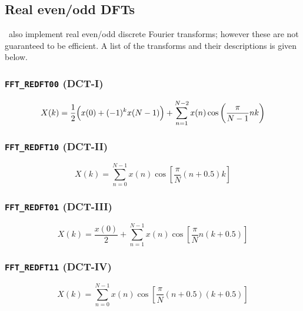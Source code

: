 \subsection{Real even/odd DFTs}
\label{module:fft:r2r}
%
\liquid\ also implement real even/odd discrete Fourier transforms;
however these are not guaranteed to be efficient.
A list of the transforms and their descriptions is given below.
%
\subsubsection{{\tt FFT\_REDFT00} (DCT-I)}
\label{module:fft:r2r:REDFT00}
    \begin{equation}
    \label{eqn:fft:dct-I}
        X(k) = \frac{1}{2}\Bigl( x(0) + (-1)^k x(N-1) \Bigr) + 
               \sum_{n=1}^{N-2}{x(n) \cos\left(\frac{\pi}{N-1}nk\right) }
    \end{equation}

\subsubsection{{\tt FFT\_REDFT10} (DCT-II)}
\label{module:fft:r2r:REDFT10}
    \begin{equation}
    \label{eqn:fft:dct-II}
        X(k) =  \sum_{n=0}^{N-1}{
                    x(n) \cos\left[
                        \frac{\pi}{N}\left(n + 0.5\right)k
                    \right]
                }
    \end{equation}

\subsubsection{{\tt FFT\_REDFT01} (DCT-III)}
\label{module:fft:r2r:REDFT01}
    \begin{equation}
    \label{eqn:fft:dct-III}
        X(k) =  \frac{x(0)}{2} +
                \sum_{n=1}^{N-1}{
                    x(n) \cos\left[
                        \frac{\pi}{N}n\left(k + 0.5\right)
                    \right]
                }
    \end{equation}

\subsubsection{{\tt FFT\_REDFT11} (DCT-IV)}
\label{module:fft:r2r:REDFT11}
    \begin{equation}
    \label{eqn:fft:dct-IV}
        X(k) =  \sum_{n=0}^{N-1}{
                    x(n) \cos\left[
                        \frac{\pi}{N}
                        \left(n+0.5\right)
                        \left(k+0.5\right)
                    \right]
                }
    \end{equation}

